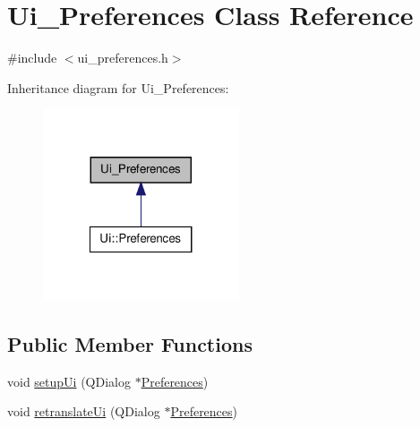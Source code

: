 \hypertarget{classUi__Preferences}{
\section{Ui\_\-Preferences Class Reference}
\label{classUi__Preferences}
}


{\ttfamily \#include $<$ui\_\-preferences.h$>$}



Inheritance diagram for Ui\_\-Preferences:
\nopagebreak
\begin{figure}[H]
\begin{center}
\leavevmode
\includegraphics[width=164pt]{classUi__Preferences__inherit__graph}
\end{center}
\end{figure}
\subsection*{Public Member Functions}
\begin{DoxyCompactItemize}
\item 
void \hyperlink{classUi__Preferences_a2c535ca36a3133132a7c858a4972df85}{setupUi} (QDialog $\ast$\hyperlink{classPreferences}{Preferences})
\item 
void \hyperlink{classUi__Preferences_ab767b13e8a1f7e884935d112f2e17ab2}{retranslateUi} (QDialog $\ast$\hyperlink{classPreferences}{Preferences})
\end{DoxyCompactItemize}
